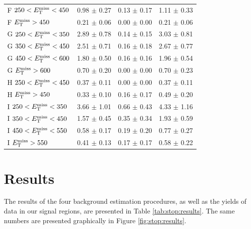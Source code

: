 \begin{table}[htbp]
\begin{tabular}{|l|cc|c|}
\hline
 F $250<E_\text{T}^\text{miss}<450$ & 0.98 $\pm$ 0.27   & 0.13 $\pm$ 0.17   & 1.11 $\pm$ 0.33   \\
 F $E_\text{T}^\text{miss}>450$ & 0.21 $\pm$ 0.06   & 0.00 $\pm$ 0.00   & 0.21 $\pm$ 0.06   \\
\hline
 G $250<E_\text{T}^\text{miss}<350$ & 2.89 $\pm$ 0.78   & 0.14 $\pm$ 0.15   & 3.03 $\pm$ 0.81   \\
 G $350<E_\text{T}^\text{miss}<450$ & 2.51 $\pm$ 0.71   & 0.16 $\pm$ 0.18   & 2.67 $\pm$ 0.77   \\
 G $450<E_\text{T}^\text{miss}<600$ & 1.80 $\pm$ 0.50   & 0.16 $\pm$ 0.16   & 1.96 $\pm$ 0.54   \\
 G $E_\text{T}^\text{miss}>600$ & 0.70 $\pm$ 0.20   & 0.00 $\pm$ 0.00   & 0.70 $\pm$ 0.23   \\
\hline
 H $250<E_\text{T}^\text{miss}<450$ & 0.37 $\pm$ 0.11   & 0.00 $\pm$ 0.00   & 0.37 $\pm$ 0.11   \\
 H $E_\text{T}^\text{miss}>450$ & 0.33 $\pm$ 0.10   & 0.16 $\pm$ 0.17   & 0.49 $\pm$ 0.20   \\
\hline
 I $250<E_\text{T}^\text{miss}<350$ & 3.66 $\pm$ 1.01   & 0.66 $\pm$ 0.43   & 4.33 $\pm$ 1.16   \\
 I $350<E_\text{T}^\text{miss}<450$ & 1.57 $\pm$ 0.45   & 0.35 $\pm$ 0.34   & 1.93 $\pm$ 0.59   \\
 I $450<E_\text{T}^\text{miss}<550$ & 0.58 $\pm$ 0.17   & 0.19 $\pm$ 0.20   & 0.77 $\pm$ 0.27   \\
 I $E_\text{T}^\text{miss}>550$ & 0.41 $\pm$ 0.13   & 0.17 $\pm$ 0.17   & 0.58 $\pm$ 0.22   \\
\hline
\end{tabular}
\end{table}

\clearpage

\section{Results}
\label{sec:stop:results}

The results of the four background estimation procedures, as well as
the yields of data in our signal regions, are presented in Table
\ref{tab:stop:results}. The same numbers are presented graphically in
Figure \ref{fig:stop:results}.

